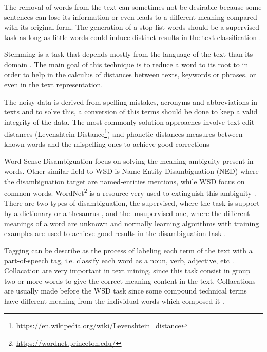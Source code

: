 The removal of words from the text can sometimes not be desirable because some sentences can lose its information or even leads to a different meaning compared with its original form. The generation of a stop list words should be a supervised task as long as little words could induce distinct results in the text classification \cite{kn:Riloff1995}.

Stemming is a task that depends mostly from the language of the text than its domain \cite{kn:Stavrianou2007}. The main goal of this technique is to reduce a word to its root to in order to help in the calculus of distances between texts, keywords or phrases, or even in the text representation.

The noisy data is derived from spelling mistakes, acronyms and abbreviations in texts and to solve this, a conversion of this terms should be done to keep a valid integrity of the data. The most commonly solution approaches involve text edit distances (Levenshtein Distance\footnote{\url{https://en.wikipedia.org/wiki/Levenshtein_distance}}) and phonetic distances measures between known words and the mispelling ones to achieve good corrections \cite{kn:Bontcheva2013} 

Word Sense Disambiguation focus on solving the meaning ambiguity present in words. Other similar field to WSD is Name Entity Disambiguation (NED) where the disambiguation target are named-entities mentions, while WSD focus on common words. WordNet\footnote{\url{https://wordnet.princeton.edu/}} is a resource very used to extinguish this ambiguity \cite{kn:Chang2016}. There are two types of disambiguation, the supervised, where the task is support by a dictionary or a thesaurus \cite{kn:Stavrianou2007}, and the unsupervised one, where the different meanings of a word are unknown and normally learning algorithms with training examples are used to achieve good results in the disambiguation task \cite{kn:Yarowsky1995}.

Tagging can be describe as the process of labeling each term of the text with a part-of-speech tag, i.e. classify each word as a noun, verb, adjective, etc \cite{kn:Hotho2005}. Collacation are very important in text mining, since this task consist in group two or more words to give the correct meaning content in the text. Collacations are usually made before the WSD task since some compound technical terms have different meaning from the individual words which composed it \cite{kn:Stavrianou2007}.

